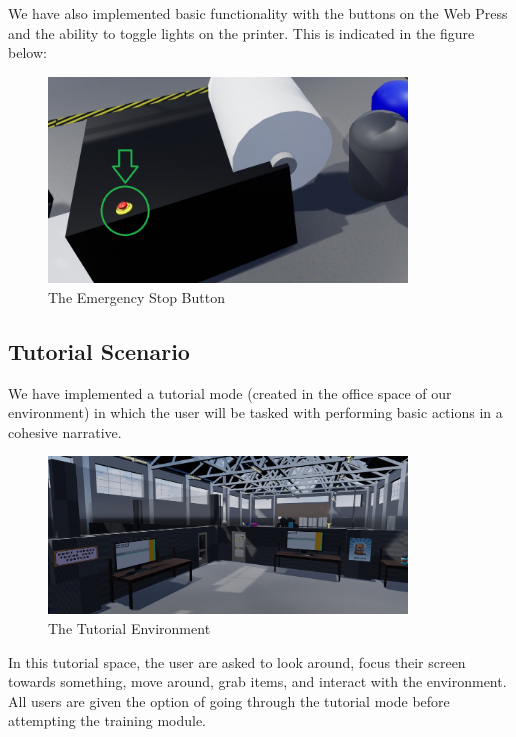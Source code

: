 \documentclass[onecolumn, draftclsnofoot,10pt, compsoc]{IEEEtran}
\begin{document}
We have also implemented basic functionality with the buttons on the Web Press and the ability to toggle lights on the printer. This is indicated in the figure below: 

\begin{figure}[ht!]
    \centering
    \includegraphics[width=0.85\textwidth]{button.png}
    \caption{The Emergency Stop Button}
    \label{fig:stopbutton}
\end{figure}

\subsection{Tutorial Scenario}

We have implemented a tutorial mode (created in the office space of our environment) in which the user will be tasked with performing basic actions in a cohesive narrative. 

\begin{figure}[ht!]
    \centering
    \includegraphics[width=0.85\textwidth]{tutorialSpace.png}
    \caption{The Tutorial Environment}
    \label{fig:tutorial}
\end{figure}


In this tutorial space, the user are asked to look around, focus their screen towards something, move around, grab items, and interact with the environment. 
All users are given the option of going through the tutorial mode before attempting the training module.
\end{document}
